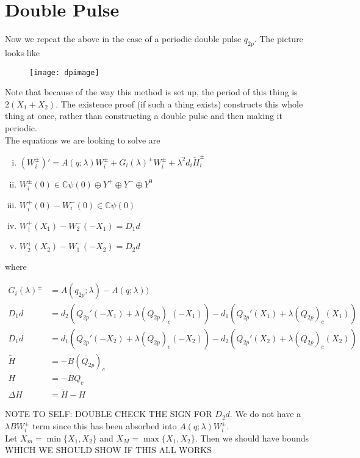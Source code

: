 \documentclass[12pt]{article}
\def\C{{\mathbb C}}
\begin{document}
\section*{Double Pulse}

Now we repeat the above in the case of a periodic double pulse $q_{2p}$. The picture looks like

\begin{figure}[H]
\texttt{[image: dpimage]}
\end{figure}

Note that because of the way this method is set up, the period of this thing is $2(X_1 + X_2)$. The existence proof (if such a thing exists) constructs this whole thing at once, rather than constructing a double pulse and then making it periodic. \\

The equations we are looking to solve are

\begin{enumerate}[(i)]
\item $(W_i^\pm)' = A(q; \lambda) W_i^\pm + G_i(\lambda)^\pm W_i^\pm + \lambda^2 d_i \tilde{H}_i^\pm$
\item $W_i^\pm(0) \in \C \psi(0) \oplus Y^+ \oplus Y^- \oplus Y^0$
\item $W_i^+(0) - W_i^-(0) \in \C \psi(0) $
\item $W_1^+(X_1) - W_2^-(-X_1) = D_1 d$
\item $W_2^+(X_2) - W_1^-(-X_2) = D_2 d$
\end{enumerate}

where

\begin{align*}
G_i(\lambda)^\pm &= A(q_{2p};\lambda) - A(q;\lambda)) \\
D_1 d &= d_2(Q_{2p}'(-X_1) + \lambda (Q_{2p})_c(-X_1))
- d_1 ( Q_{2p}'(X_1) + \lambda (Q_{2p})_c(X_1) ) \\
D_1 d &= d_1(Q_{2p}'(-X_2) + \lambda (Q_{2p})_c(-X_2))
- d_2 ( Q_{2p}'(X_2) + \lambda (Q_{2p})_c(X_2) ) \\
\tilde{H} &= -B(Q_{2p})_c \\
H &= -B Q_c \\
\Delta H &= \tilde{H} - H
\end{align*}

NOTE TO SELF: DOUBLE CHECK THE SIGN FOR $D_2 d$. We do not have a $\lambda B W_i^\pm$ term since this has been absorbed into $A(q; \lambda) W_i^\pm$. \\

Let $X_m = \min\{ X_1, X_2 \}$ and $X_M = \max\{ X_1, X_2 \}$. Then we should have bounds WHICH WE SHOULD SHOW IF THIS ALL WORKS
\end{document}
